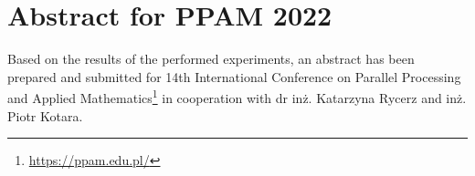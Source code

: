 \documentclass[../main.tex]{subfiles}
\begin{document}
\chapter{Abstract for PPAM 2022}
\label{chap:B}

Based on the results of the performed experiments, an abstract has been prepared and submitted for 14th International Conference on Parallel Processing and Applied Mathematics\footnote{\url{https://ppam.edu.pl/}} in cooperation with dr inż. Katarzyna Rycerz and inż. Piotr Kotara.


\end{document}
